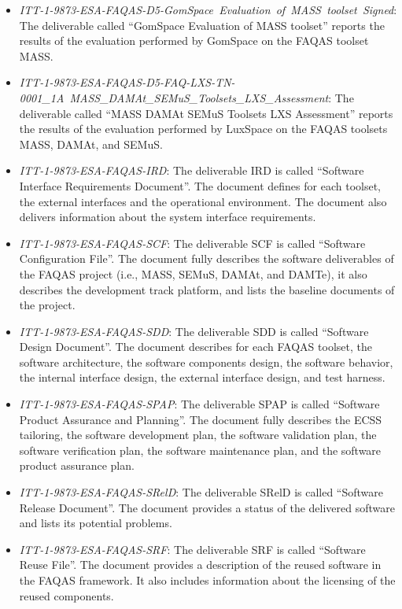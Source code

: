 \begin{itemize}
	\item \emph{ITT-1-9873-ESA-FAQAS-D5-GomSpace\ Evaluation\ of\ MASS\ toolset\ Signed}: The deliverable called ``GomSpace Evaluation of MASS toolset'' reports the results of the evaluation performed by GomSpace on the FAQAS toolset MASS.

	\item \emph{ITT-1-9873-ESA-FAQAS-D5-FAQ-LXS-TN-0001\_1A\ MASS\_DAMAt\_SEMuS\_Toolsets\_LXS\_Assessment}: The deliverable called ``MASS DAMAt SEMuS Toolsets LXS Assessment'' reports the results of the evaluation performed by LuxSpace on the FAQAS toolsets MASS, DAMAt, and SEMuS.
 
	\item \emph{ITT-1-9873-ESA-FAQAS-IRD}: The deliverable IRD is called ``Software Interface Requirements Document''. The document defines for each toolset, the external interfaces and the operational environment. The document also delivers information about the system interface requirements. 

	\item \emph{ITT-1-9873-ESA-FAQAS-SCF}: The deliverable SCF is called ``Software Configuration File''. The document fully describes the software deliverables of the FAQAS project (i.e., MASS, SEMuS, DAMAt, and DAMTe), it also describes the development track platform, and lists the baseline documents of the project.

	\item \emph{ITT-1-9873-ESA-FAQAS-SDD}: The deliverable SDD is called ``Software Design Document''. The document describes for each FAQAS toolset, the software architecture, the software components design, the software behavior, the internal interface design, the external interface design, and test harness.

	\item \emph{ITT-1-9873-ESA-FAQAS-SPAP}: The deliverable SPAP is called ``Software Product Assurance and Planning''. The document fully describes the ECSS tailoring, the software development plan, the software validation plan, the software verification plan, the software maintenance plan, and the software product assurance plan.

	\item \emph{ITT-1-9873-ESA-FAQAS-SRelD}: The deliverable SRelD is called ``Software Release Document''. The document provides a status of the delivered software and lists its potential problems.

	\item \emph{ITT-1-9873-ESA-FAQAS-SRF}: The deliverable SRF is called ``Software Reuse File''. The document provides a description of the reused software in the FAQAS framework. It also includes information about the licensing of the reused components.


\end{itemize}
